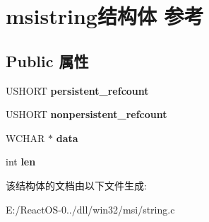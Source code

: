 \hypertarget{structmsistring}{}\section{msistring结构体 参考}
\label{structmsistring}
\subsection*{Public 属性}
\begin{DoxyCompactItemize}
\item 
\mbox{\label{structmsistring_ade5394b07b79c83138f705008b38edbf}} 
U\+S\+H\+O\+RT {\bfseries persistent\+\_\+refcount}
\item 
\mbox{\label{structmsistring_a8fb1adef51d08aa16d2933a94a8e2373}} 
U\+S\+H\+O\+RT {\bfseries nonpersistent\+\_\+refcount}
\item 
\mbox{\label{structmsistring_a6ad07edf8ecef8f3c4ac4f6a79eb1cbc}} 
W\+C\+H\+AR $\ast$ {\bfseries data}
\item 
\mbox{\label{structmsistring_ab2f2ace8f19bf9ba5259504e9a368c48}} 
int {\bfseries len}
\end{DoxyCompactItemize}


该结构体的文档由以下文件生成\+:\begin{DoxyCompactItemize}
\item 
E\+:/\+React\+O\+S-\/0../dll/win32/msi/string.\+c\end{DoxyCompactItemize}
